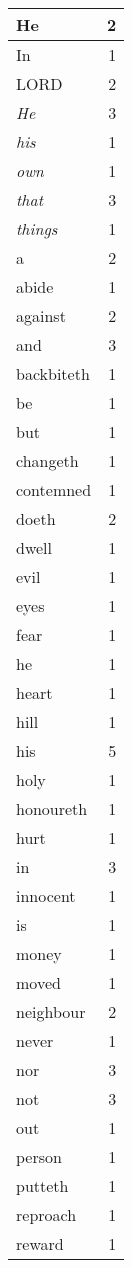 \begin{center}
\begin{longtable}{l|r}
\hline \hline
\endlastfoot
He & 2 \\ \hline
In & 1 \\ \hline
LORD & 2 \\ \hline
\emph{He} & 3 \\ \hline
\emph{his} & 1 \\ \hline
\emph{own} & 1 \\ \hline
\emph{that} & 3 \\ \hline
\emph{things} & 1 \\ \hline
a & 2 \\ \hline
abide & 1 \\ \hline
against & 2 \\ \hline
and & 3 \\ \hline
backbiteth & 1 \\ \hline
be & 1 \\ \hline
but & 1 \\ \hline
changeth & 1 \\ \hline
contemned & 1 \\ \hline
doeth & 2 \\ \hline
dwell & 1 \\ \hline
evil & 1 \\ \hline
eyes & 1 \\ \hline
fear & 1 \\ \hline
he & 1 \\ \hline
heart & 1 \\ \hline
hill & 1 \\ \hline
his & 5 \\ \hline
holy & 1 \\ \hline
honoureth & 1 \\ \hline
hurt & 1 \\ \hline
in & 3 \\ \hline
innocent & 1 \\ \hline
is & 1 \\ \hline
money & 1 \\ \hline
moved & 1 \\ \hline
neighbour & 2 \\ \hline
never & 1 \\ \hline
nor & 3 \\ \hline
not & 3 \\ \hline
out & 1 \\ \hline
person & 1 \\ \hline
putteth & 1 \\ \hline
reproach & 1 \\ \hline
reward & 1 \\ \hline

\end{longtable}
\end{center}
